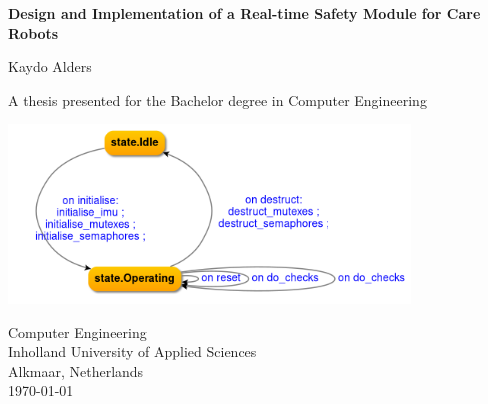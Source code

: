 \documentclass[12pt]{scrreprt}
\begin{document}

\lstset{escapechar=@,style=customc}

\begin{titlepage}
    \begin{center}
        \vspace*{1cm}
            
        \LARGE
        \textbf{Design and Implementation of a Real-time Safety Module for Care Robots}
            
        \vspace{0.5cm}
            
        \vspace{1.5cm}
            
        Kaydo Alders
            
        \vfill
            
        A thesis presented for the Bachelor degree in Computer Engineering
            
        \vspace{0.8cm}
            
        \includegraphics[width=0.8\textwidth]{Figures/results/modelling_figures/IController/IController_state_chart.png}
        
        \vspace{0.8cm}
        
        \Large
        Computer Engineering\\
        Inholland University of Applied Sciences\\
        Alkmaar, Netherlands\\
        \today
            
    \end{center}
\end{titlepage}
\end{document}
